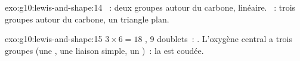 \begin{solution}{exo:g10:lewis-and-shape:14}
~: deux groupes autour du carbone,
linéaire. ~: trois groupes
autour du carbone, un triangle plan.
\end{solution}

\begin{solution}{exo:g10:lewis-and-shape:15}
$3 \times 6 = 18$ , 9 doublets~:
.
L'oxygène central a trois groupes (une , une liaison
simple, un )~: la  est coudée.
\end{solution}

